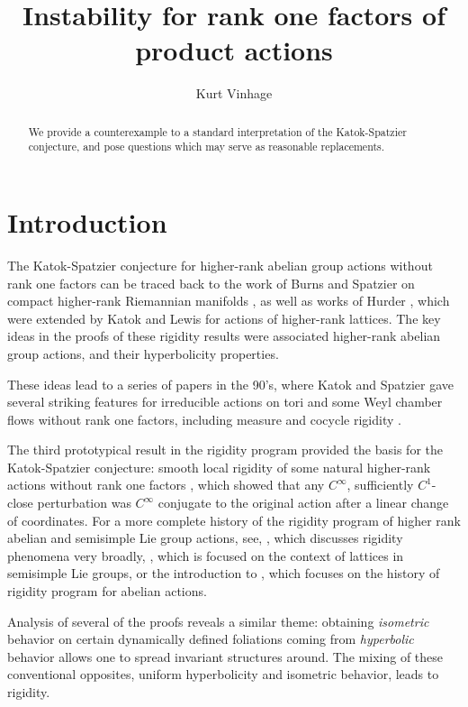 \documentclass[12pt]{amsart}
\title{Instability for rank one factors of product actions}
\author{Kurt Vinhage}
\theoremstyle{definition}
\theoremstyle{remark}
\numberwithin{equation}{section}
\newtheorem{Structural Stability Theorem}[theorem]{Structural Stability Theorem}
\begin{document}
\maketitle


\begin{abstract}
We provide a counterexample to a standard interpretation of the Katok-Spatzier conjecture, and pose questions which may serve as reasonable replacements.
\end{abstract}

\section{Introduction}

The Katok-Spatzier conjecture for higher-rank abelian group actions without rank one factors can be traced back to the work of Burns and Spatzier on compact higher-rank Riemannian manifolds \cite{burns-spatzier}, as well as works of Hurder \cite{hurder90}, which were extended by Katok and Lewis \cite{katok-lewis1,katok-lewis2} for actions of higher-rank lattices. The key ideas in the proofs of these rigidity results were associated higher-rank abelian group actions, and their hyperbolicity properties.

These ideas lead to a series of papers in the 90's, where Katok and Spatzier gave several striking features for irreducible actions on tori and some Weyl chamber flows without rank one factors, including measure and cocycle rigidity \cite{ks-meas,ks-coc}.

The third prototypical result in the rigidity program provided the basis for the Katok-Spatzier conjecture: smooth local rigidity of some natural higher-rank actions without rank one factors \cite{ks-local}, which showed that any $C^\infty$, sufficiently $C^1$-close perturbation was $C^\infty$ conjugate to the original action after a linear change of coordinates. For a more complete history of the rigidity program of higher rank abelian and semisimple Lie group actions, see, \cite{spatzier-survey}, which discusses rigidity phenomena very broadly, \cite{fisher-survey}, which is focused on the context of lattices in semisimple Lie groups, or the introduction to \cite{spatzier-vinhage}, which focuses on the history of rigidity program for abelian actions.

Analysis of several of the proofs reveals a similar theme: obtaining {\it isometric} behavior on certain dynamically defined foliations coming from {\it hyperbolic} behavior allows one to spread invariant structures around. The mixing of these conventional opposites, uniform hyperbolicity and isometric behavior, leads to rigidity.
\end{document}
